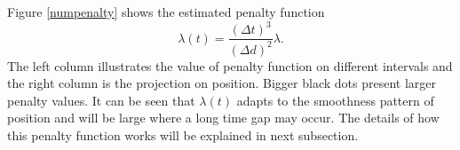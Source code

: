 Figure \ref{numpenalty} shows the estimated penalty function
\begin{equation}
\lambda(t)=\frac{(\Delta t)^3}{(\Delta d)^2}\lambda.
\end{equation}
The left column illustrates the value of penalty function on different intervals and the right column is the projection on position. Bigger black dots present larger penalty values. It can be seen that $\lambda(t)$ adapts to the smoothness pattern of position and will be large where a long time gap may occur. The details of how this penalty function works will be explained in next subsection.



